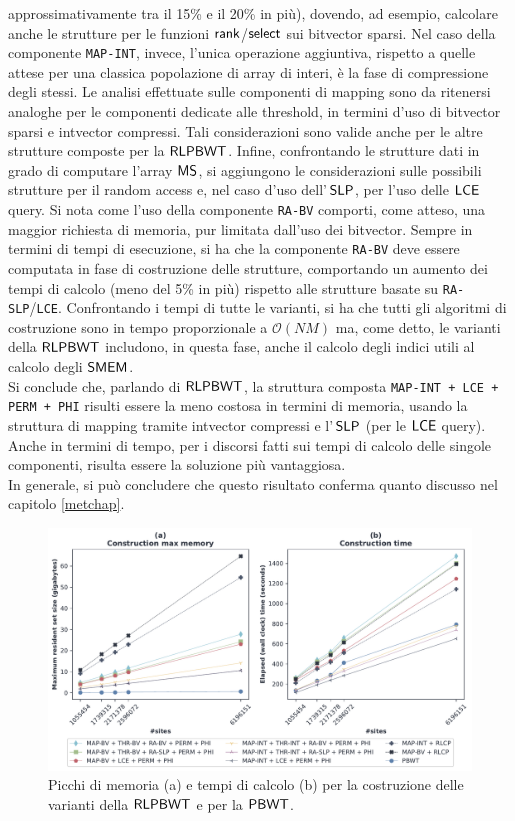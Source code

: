 approssimativamente tra il 15\% e il 20\% in più), dovendo, ad esempio,
calcolare anche le strutture per le funzioni $\mbox{\rm {\sf rank}}$/$\mbox{\rm {\sf select}}$ sui bitvector
sparsi. Nel caso della componente 
\texttt{MAP-INT}, invece, l'unica operazione aggiuntiva, rispetto a quelle attese
per una classica popolazione di array di interi, è la fase di compressione degli
stessi. Le analisi effettuate sulle componenti di mapping sono da
ritenersi analoghe per le componenti dedicate alle threshold, in
termini d'uso di bitvector sparsi e intvector compressi.
Tali considerazioni sono valide anche per le altre strutture
composte per la $\mbox{\rm {\sf RLPBWT}}$. Infine, confrontando le strutture dati in grado
di computare l'array $\mbox{\rm {\sf MS}}$, si aggiungono le considerazioni sulle possibili
strutture per il random access e, nel caso d'uso dell'$\,\mbox{\rm {\sf SLP}}$, per l'uso
delle $\mbox{\rm {\sf LCE}}$ query. Si nota come l'uso della componente \texttt{RA-BV}
comporti, come atteso, una maggior richiesta di memoria, pur limitata dall'uso
dei bitvector. Sempre in termini di tempi di esecuzione, si ha che la
componente \texttt{RA-BV} deve essere computata in fase di costruzione delle
strutture, comportando un aumento dei tempi di calcolo (meno del 5\% in
più) rispetto alle strutture basate su
\texttt{RA-SLP}/\texttt{LCE}. Confrontando i tempi di  
tutte le varianti, si ha che tutti gli algoritmi di costruzione sono in tempo
proporzionale a $\mathcal{O}(NM)$ ma, come detto, le varianti della
$\mbox{\rm {\sf RLPBWT}}$ includono, in questa fase, anche il calcolo degli indici
utili al calcolo degli $\mbox{\rm {\sf SMEM}}$. \\
Si conclude che, parlando di $\mbox{\rm {\sf RLPBWT}}$, la
struttura composta \texttt{MAP-INT + LCE + PERM + PHI} risulti essere la meno
costosa in termini di memoria, usando la struttura di mapping tramite
intvector compressi e l'$\,\mbox{\rm {\sf SLP}}$ (per le $\mbox{\rm {\sf LCE}}$ query).
Anche in termini di tempo, per i discorsi fatti sui tempi di calcolo
delle singole componenti, risulta essere la soluzione più vantaggiosa.\\
In generale, si può 
concludere che questo risultato conferma quanto discusso nel capitolo
\ref{metchap}.\\ 
\begin{figure}
  \centering
  \includegraphics[width=\linewidth]{img/make_time_mem_paper.pdf}
  \caption{Picchi di memoria (a) e tempi di calcolo (b) per la
    costruzione delle varianti della $\mbox{\rm {\sf RLPBWT}}$ e per 
    la $\mbox{\rm {\sf PBWT}}$.}
  \label{fig:maketimememchr}
\end{figure}
